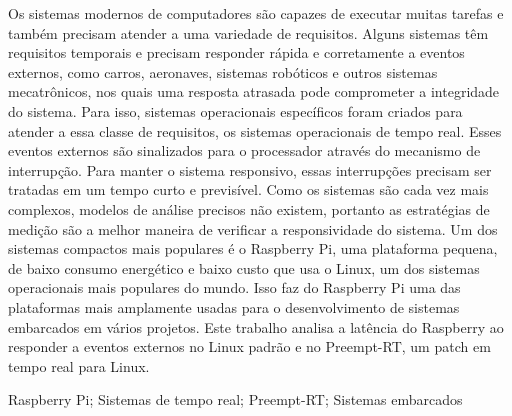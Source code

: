 \resumo

Os sistemas modernos de computadores são capazes de executar muitas tarefas e também precisam atender a uma variedade de requisitos. Alguns sistemas têm requisitos temporais e precisam responder rápida e corretamente a eventos externos, como carros, aeronaves, sistemas robóticos e outros sistemas mecatrônicos, nos quais uma resposta atrasada pode comprometer a integridade do sistema. Para isso, sistemas operacionais específicos foram criados para atender a essa classe de requisitos, os sistemas operacionais de tempo real. Esses eventos externos são sinalizados para o processador através do mecanismo de interrupção. Para manter o sistema responsivo, essas interrupções precisam ser tratadas em um tempo curto e previsível. Como os sistemas são cada vez mais complexos, modelos de análise precisos não existem, portanto as estratégias de medição são a melhor maneira de verificar a responsividade do sistema. Um dos sistemas compactos mais populares é o Raspberry Pi, uma plataforma pequena, de baixo consumo energético e baixo custo que usa o Linux, um dos sistemas operacionais mais populares do mundo. Isso faz do Raspberry Pi uma das plataformas mais amplamente usadas para o desenvolvimento de sistemas embarcados em vários projetos. Este trabalho analisa a latência do Raspberry ao responder a eventos externos no Linux padrão e no Preempt-RT, um patch em tempo real para Linux.

\begin{keywords}
Raspberry Pi; Sistemas de tempo real; Preempt-RT; Sistemas embarcados
\end{keywords}
